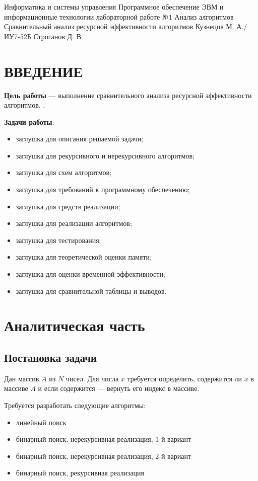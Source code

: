 \documentclass{bmstu}
\begin{document}
\makereporttitle
{Информатика и системы управления}
{Программное обеспечение ЭВМ и информационные технологии}
{лабораторной работе №1}
{Анализ алгоритмов}
{Сравнительный анализ ресурсной эффективности алгоритмов}
{} %
{Кузнецов М. А./ИУ7-52Б} %
{Строганов Д. В.}

\maketableofcontents

\chapter*{ВВЕДЕНИЕ}

\textbf{Цель работы} --- выполнение сравнительного анализа ресурсной эффективности алгоритмов.
\cite{placeholder-source}.

\textbf{Задачи работы}:

\renewcommand{\labelitemi}{---}
\begin{itemize}
	\item заглушка для описания решаемой задачи;
	\item заглушка для рекурсивного и нерекурсивного алгоритмов;
	\item заглушка для схем алгоритмов;
	\item заглушка для требований к программному обеспечению;
	\item заглушка для средств реализации;
	\item заглушка для реализации алгоритмов;
	\item заглушка для тестирования;
	\item заглушка для теоретической оценки памяти;
	\item заглушка для оценки временной эффективности;
	\item заглушка для сравнительной таблицы и выводов.
\end{itemize}

\chapter{Аналитическая часть}

\section{Постановка задачи}
Дан массив $A$ из $N$ чисел. Для числа $x$ требуется определить,
содержится ли $x$ в массиве $A$ и если содержится --- вернуть его
индекс в массиве.

Требуется разработать следующие алгоритмы:
\begin{itemize}
	\item линейный поиск
	\item бинарный поиск, нерекурсивная реализация, 1-й вариант
	\item бинарный поиск, нерекурсивная реализация, 2-й вариант
	\item бинарный поиск, рекурсивная реализация
\end{itemize}
\end{document}
